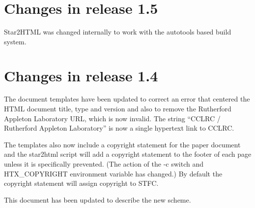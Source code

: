 \documentclass[twoside,11pt,nolof]{starlink}
\begin{document}
\section{\label{changes15}Changes in release 1.5}
Star2HTML was changed internally to work with the autotools based
build system.

\section{\label{changes14}Changes in release 1.4}
The document templates have been updated to correct an error that centered
the HTML document title, type and version and also to remove the Rutherford
Appleton Laboratory URL, which is now invalid. The string ``CCLRC /
Rutherford Appleton Laboratory'' is now a single hypertext link to CCLRC.

The templates also now include a copyright statement for the paper document
and the star2html script will add a copyright statement to the footer of each
page unless it is specifically prevented. (The action of the -c switch and
HTX\_COPYRIGHT environment variable has changed.) By default the copyright
statement will assign copyright to STFC.

This document has been updated to describe the new scheme.
\end{document}
